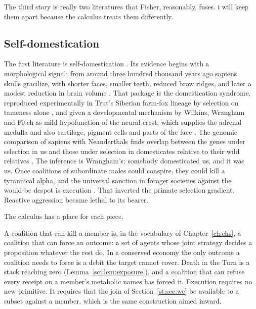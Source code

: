 The third story is really two literatures that Fisher, reasonably, fuses. i will keep them apart because the calculus treats them differently.

\subsection{Self-domestication}

The first literature is self-domestication \cite{wrangham2019,wrangham2018,hare2017,hare2012}. Its evidence begins with a morphological signal: from around three hundred thousand years ago sapiens skulls gracilize, with shorter faces, smaller teeth, reduced brow ridges, and later a modest reduction in brain volume \cite{cieri2014,desilva2021}. That package is the domestication syndrome, reproduced experimentally in Trut's Siberian farm-fox lineage by selection on tameness alone \cite{trut1999,dugatkin2017}, and given a developmental mechanism by Wilkins, Wrangham and Fitch as mild hypofunction of the neural crest, which supplies the adrenal medulla and also cartilage, pigment cells and parts of the face \cite{wilkins2014}. The genomic comparison of sapiens with Neanderthals finds overlap between the genes under selection in us and those under selection in domesticates relative to their wild relatives \cite{theofanopoulou2017}. The inference is Wrangham's: somebody domesticated us, and it was us. Once coalitions of subordinate males could conspire, they could kill a tyrannical alpha, and the universal sanction in forager societies against the would-be despot is execution \cite{boehm1999,boehm2012}. That inverted the primate selection gradient. Reactive aggression became lethal to its bearer.

The calculus has a place for each piece.

\begin{observation}
\label{st:obs:coalition}
A coalition that can kill a member is, in the vocabulary of Chapter~\ref{ch:chs}, a coalition that can force an outcome: a set of agents whose joint strategy decides a proposition whatever the rest do. In a conserved economy the only outcome a coalition needs to force is a debit the target cannot cover. Death in the Turn is a stack reaching zero (Lemma~\ref{sci:lem:exposure}), and a coalition that can refuse every receipt on a member's metabolic names has forced it. Execution requires no new primitive. It requires that the join of Section~\ref{st:sec:we} be available to a subset against a member, which is the same construction aimed inward.
\end{observation}

